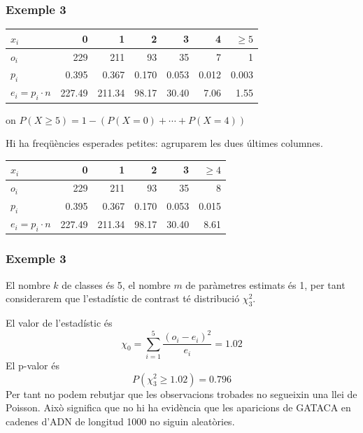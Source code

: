 \documentclass[12pt,t]{beamer}
\renewcommand{\geq}{\geqslant}
\theoremstyle{plain}
\theoremstyle{definition}
\begin{document}
\begin{frame}
\frametitle{Exemple 3}
\vspace*{-2ex}

\begin{center}
\small \begin{tabular}{|l|rrrrrr|}
\hline
$x_i$ & 0 & 1 & 2 & 3 & 4 & $\geq 5$ \\
\hline
$o_{i}$& 229 & 211 & 93 & 35 & 7 & 1 \\
\hline
$p_i$ &0.395 &  0.367  &0.170 & 0.053 & 0.012 & 0.003 \\ \hline
$e_i=p_i\cdot n$ &  227.49 & 211.34 & 98.17 & 30.40  & 7.06 &  1.55\\ \hline
\end{tabular}
\end{center}
on $P(X\geq 5)=1-(P(X=0)+\cdots +P(X=4))$
\medskip

Hi ha freqüències esperades petites: agruparem les dues últimes columnes. 
\medskip

\begin{center}
\small \begin{tabular}{|l|rrrrr|}
\hline
$x_i$ & 0 & 1 & 2 & 3 & $\geq 4$ \\
\hline
$o_{i}$& 229 & 211 & 93 & 35 & 8 \\
\hline
$p_i$ &0.395 &  0.367  &0.170 & 0.053 & 0.015 \\ \hline
$e_i=p_i\cdot n$ &  227.49 & 211.34 & 98.17 & 30.40  & 8.61\\ \hline
\end{tabular}
\end{center}



\end{frame}


\begin{frame}
\frametitle{Exemple 3}
El nombre $k$ de classes és 5, el nombre $m$ de paràmetres estimats és 1, per tant considerarem que l'estadístic de contrast té distribució $\chi^2_{3}$.
\medskip

El valor de l'estadístic és
$$
\chi_0=\sum_{i=1}^5\frac{(o_i-e_i)^2}{e_i}=1.02
$$
El p-valor és
$$
P(\chi_3^2\geq 1.02)=0.796
$$
Per tant no podem rebutjar que les observacions trobades no segueixin una llei de Poisson. Això significa que no hi ha evidència que les aparicions de GATACA en cadenes d'ADN de longitud 1000 no siguin aleatòries.
\end{frame}
\end{document}
